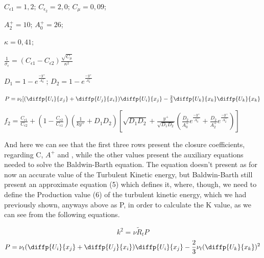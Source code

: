 \documentclass{article}
\begin{document}
\bigskip
\bigskip
\begin{center}
    ${C_{\epsilon1}}=1,2$; ${C_{\epsilon_2}}=2,0$; ${C_\mu}=0,09$;
\end{center}
\bigskip
   \begin{center}
     ${A^+_2}=10$;
   ${A^+_0}=26$;
   \end{center}
\bigskip
      \begin{center}
   ${\kappa}=0,41$;
\end{center}
\bigskip
\begin{center}
    $\frac{1}{\sigma_\epsilon}=({C_{\epsilon1}}-{C_{\epsilon2}}){\frac{\sqrt{C_\mu}}{{\kappa}^2}}$
\end{center}
\bigskip
\begin{center}
    ${D_1}=1-{e}^{\frac{-y^+}{A_0^+}}$;
    ${D_2}=1-{e}^{\frac{-y^+}{A_2^+}}$
\end{center}
\bigskip
\begin{center}
    $P={\nu_t}[({\diffp{U_i}{{x_j}}}+{\diffp{U_j}{{x_i}}}){\diffp{U_i}{{x_j}}}-{\frac{2}{3}}{\diffp{U_k}{{x_k}}}{\diffp{U_k}{{x_k}}}$
\end{center}
\bigskip
\begin{center}
    ${f_2}={\frac{C_{\epsilon1}}{C_{\epsilon2}}}+({1-{\frac{C_{\epsilon2}}{C_{\epsilon1}}}})({\frac{1}{ky^+}}+{D_1}{D_2})[{\sqrt{{D_1}{D_2}}}+{\frac{y^+}{\sqrt{{D_1}{D_2}}}}({\frac{D_2}{A_0^+}}e^{\frac{-y^+}{A_0^+}}+{\frac{D_2}{A_2^+}}e^{\frac{-y^+}{A_2^+}})]$
\end{center}
\bigskip
\newpage
And here we can see that the first three rows present the closure coefficients, regarding C, $A^+$ and \textkappa, while the other values present the auxiliary equations needed to solve the Baldwin-Barth equation.
The equation doesn't present as for now an accurate value of the Turbulent Kinetic energy, but Baldwin-Barth still present an approximate equation (5) which defines it, where, though, we need to define the Production value (6) of the turbulent kinetic energy, which we had previously shown, anyways above as P, in order to calculate the K value, as we can see from the following equations.

\begin{equation}
    {k^2}={\nu}{\widetilde{R}_t}{P}
\end{equation}
\begin{equation}
    {P}={\nu_t}({\diffp{U_i}{{x_j}}}+{\diffp{U_j}{{x_i}}}){\diffp{U_i}{{x_j}}}-{\frac{2}{3}}{\nu_t}({\diffp{U_k}{{x_k}}})^2
\end{equation}
\end{document}
